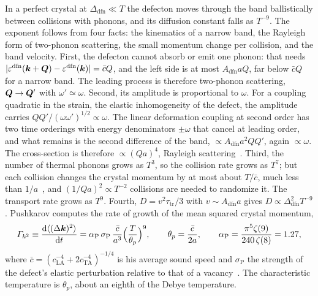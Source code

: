 In a perfect crystal at $\Delta_{\mathrm{dfn}} \ll T$ the defecton moves through the band ballistically between collisions with phonons, and its diffusion constant falls as $T^{-9}$. The exponent follows from four facts: the kinematics of a narrow band, the Rayleigh form of two-phonon scattering, the small momentum change per collision, and the band velocity. First, the defecton cannot absorb or emit one phonon: that needs $|\varepsilon^{\mathrm{dfn}}(\bm{k} + \bm{Q}) - \varepsilon^{\mathrm{dfn}}(\bm{k})| = \bar cQ$, and the left side is at most $A_{\mathrm{dfn}}aQ$, far below $\bar cQ$ for a narrow band. The leading process is therefore two-phonon scattering, $\bm{Q} \to \bm{Q}'$ with $\omega' \simeq \omega$. Second, its amplitude is proportional to $\omega$. For a coupling quadratic in the strain, the elastic inhomogeneity of the defect, the amplitude carries $QQ'/(\omega\omega')^{1/2} \propto \omega$. The linear deformation coupling at second order has two time orderings with energy denominators $\pm\omega$ that cancel at leading order, and what remains is the second difference of the band, $\propto A_{\mathrm{dfn}}a^2QQ'$, again $\propto\omega$. The cross-section is therefore $\propto (Qa)^4$, Rayleigh scattering~\cite[Eq.~(49)]{pushkarov2004quantum}. Third, the number of thermal phonons grows as $T^3$, so the collision rate grows as $T^7$; but each collision changes the crystal momentum by at most about $T/\bar c$, much less than $1/a$~\cite[Eq.~(54)]{pushkarov2004quantum}, and $(1/Qa)^2 \propto T^{-2}$ collisions are needed to randomize it. The transport rate grows as $T^9$. Fourth, $D = v^2\tau_{\mathrm{tr}}/3$ with $v \sim A_{\mathrm{dfn}}a$ gives $D \propto \Delta_{\mathrm{dfn}}^2T^{-9}$. Pushkarov computes the rate of growth of the mean squared crystal momentum,
\begin{equation}
  \varGamma_{k^2} \equiv \frac{\mathrm{d}\langle(\Delta\bm{k})^2\rangle}{\mathrm{d} t} = \alpha_{\mathrm{P}}\,\sigma_{\mathrm{P}}\,\frac{\bar c}{a^3}\Bigl(\frac{T}{\theta_p}\Bigr)^9 , \qquad
  \theta_p = \frac{\bar c}{2a} , \qquad \alpha_{\mathrm{P}} = \frac{\pi^5\zeta(9)}{240\,\zeta(8)} = 1.27 ,
  \label{eq:19.6-q2}
\end{equation}
where $\bar c = (c_{\mathrm{LA}}^{-4} + 2c_{\mathrm{TA}}^{-4})^{-1/4}$ is his average sound speed and $\sigma_{\mathrm{P}}$ the strength of the defect's elastic perturbation relative to that of a vacancy~\cite[Eqs.~(48), (58)]{pushkarov2004quantum}. The characteristic temperature is $\theta_p$, about an eighth of the Debye temperature.

